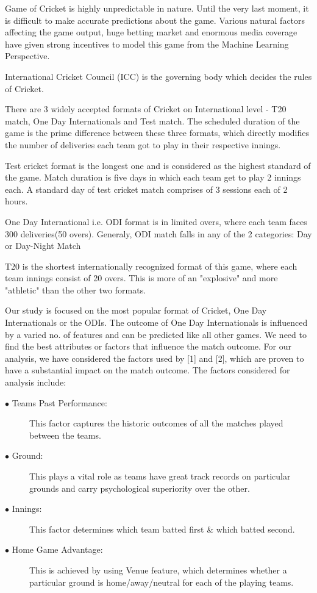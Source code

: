 \documentclass[a4paper, 10pt, conference]{IEEEtran}
\begin{document}
Game of Cricket is highly unpredictable in nature. Until the very last moment, it is difficult to make accurate predictions about the game. Various natural factors affecting the game output, huge betting market and enormous media coverage have given strong incentives to model this game from the Machine Learning Perspective.

International Cricket Council (ICC) is the governing body which decides the rules of Cricket.

There are 3 widely accepted formats of Cricket on International level - T20 match, One Day Internationals and Test match. The scheduled duration of the game is the prime difference between these three formats, which directly modifies the number of deliveries each team got to play in their respective innings.

Test cricket format is the longest one and is considered as the highest standard of the game. Match duration is five days in which each team get to play 2 innings each. A standard day of test cricket match comprises of 3 sessions each of 2 hours.

One Day International i.e. ODI format is in limited overs, where each team faces 300 deliveries(50 overs). Generaly, ODI match falls in any of the 2 categories: Day or Day-Night Match

T20 is the shortest internationally recognized format of this game, where each team innings consist of 20 overs. This is more of an "explosive" and more "athletic" than the other two formats.

Our study is focused on the most popular format of Cricket, One Day Internationals or the ODIs. The outcome of One Day Internationals is influenced by a varied no. of features and can be predicted like all other games. We need to find the best attributes or factors that influence the match outcome. For our analysis, we have considered the factors used by [1] and [2], which are proven to have a substantial impact on the match outcome. The factors considered for analysis include:

\begin{description}
  \item[$\bullet$ Teams Past Performance:] This factor captures the historic outcomes of all the matches played between the teams.
  \item[$\bullet$ Ground:] This plays a vital role as teams have great track records on particular grounds and carry psychological superiority over the other.
  \item[$\bullet$ Innings:] This factor determines which team batted first \& which batted second.
  \item[$\bullet$ Home Game Advantage:] This is achieved by using Venue feature, which determines whether a particular ground is home/away/neutral for each of the playing teams.
\end{description}
\end{document}
